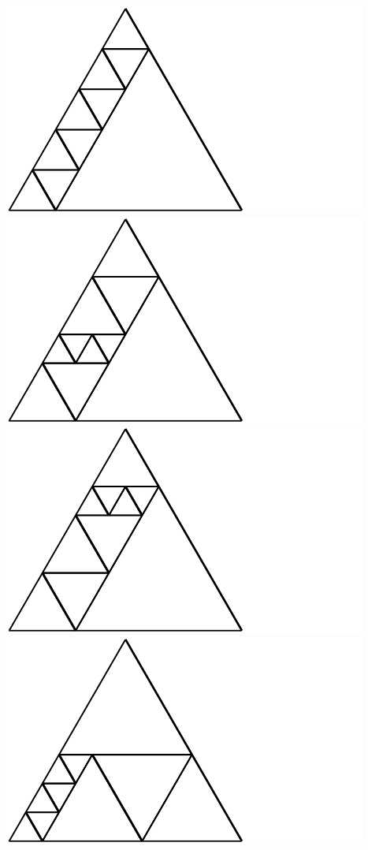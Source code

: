 \documentclass[12pt,amstags,fleqn]{article}
\theoremstyle{plain}
\theoremstyle{definition}
\begin{document}
\includegraphics{output-dissections-dissection10_i15_r4_c1.pdf}
\includegraphics{output-dissections-dissection10_i17_r1_c0.pdf}
\includegraphics{output-dissections-dissection10_i17_r1_c1.pdf}
\includegraphics{output-dissections-dissection10_i17_r3_c0.pdf}
\end{document}
